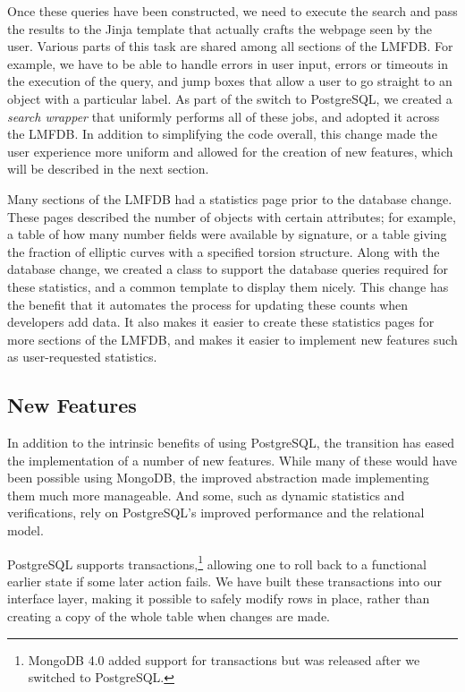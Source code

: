 \documentclass{amsart}
\begin{document}
Once these queries have been constructed, we need to execute the search and pass the results to the Jinja template that actually crafts the webpage seen by the user.
Various parts of this task are shared among all sections of the LMFDB.
For example, we have to be able to handle errors in user input, errors or timeouts in the execution of the query, and jump boxes that allow a user to go straight to an object with a particular label.
As part of the switch to PostgreSQL, we created a \emph{search wrapper} that uniformly performs all of these jobs, and adopted it across the LMFDB.
In addition to simplifying the code overall, this change made the user experience more uniform and allowed for the creation of new features, which will be described in the next section.

Many sections of the LMFDB had a statistics page prior to the database change.
These pages described the number of objects with certain attributes; for example, a table of how many number fields were available by signature, or a table giving the fraction of elliptic curves with a specified torsion structure.
Along with the database change, we created a class to support the database queries required for these statistics, and a common template to display them nicely.
This change has the benefit that it automates the process for updating these counts when developers add data.
It also makes it easier to create these statistics pages for more sections of the LMFDB, and makes it easier to implement new features such as user-requested statistics.

\subsection{New Features}


In addition to the intrinsic benefits of using PostgreSQL, the transition has eased the implementation of a number of new features.
While many of these would have been possible using MongoDB, the improved abstraction made implementing them much more manageable.
And some, such as dynamic statistics and verifications, rely on PostgreSQL's improved performance and the relational model.

PostgreSQL supports transactions,\footnote{MongoDB 4.0 added support for transactions but was released after we switched to PostgreSQL.} allowing one to roll back to a functional earlier state if some later action fails.
We have built these transactions into our interface layer, making it possible to safely modify rows in place, rather than creating a copy of the whole table when changes are made.
\end{document}

